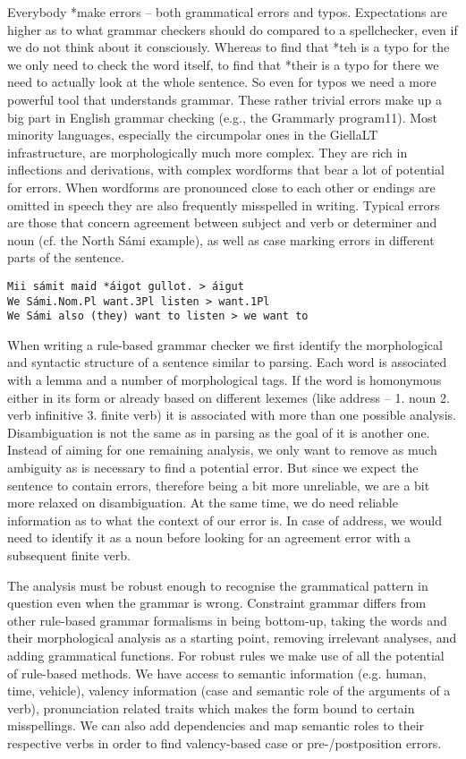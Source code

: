 \documentclass[free]{flammie}
\begin{document}
Everybody *make errors – both grammatical errors and typos. Expectations are higher as
to what grammar checkers should do compared to a spellchecker, even if we do not think
about it consciously. Whereas to find that *teh is a typo for the we only need to check the
word itself, to find that *their is a typo for there we need to actually look at the whole
sentence. So even for typos we need a more powerful tool that understands grammar.
These rather trivial errors make up a big part in English grammar checking (e.g., the
Grammarly program11). Most minority languages, especially the circumpolar ones in the
GiellaLT infrastructure, are morphologically much more complex. They are rich in inflections and derivations, with complex wordforms that bear a lot of potential for errors. When
wordforms are pronounced close to each other or endings are omitted in speech they are
also frequently misspelled in writing. Typical errors are those that concern agreement between subject and verb or determiner and noun (cf. the North Sámi example), as well as
case marking errors in different parts of the sentence.

\begin{verbatim}
Mii sámit maid *áigot gullot. > áigut
We Sámi.Nom.Pl want.3Pl listen > want.1Pl
We Sámi also (they) want to listen > we want to
\end{verbatim}

When writing a rule-based grammar checker we first identify the morphological and
syntactic structure of a sentence similar to parsing. Each word is associated with a lemma
and a number of morphological tags. If the word is homonymous either in its form or already based on different lexemes (like address – 1. noun 2. verb infinitive 3. finite verb) it
is associated with more than one possible analysis. Disambiguation is not the same as in
parsing as the goal of it is another one. Instead of aiming for one remaining analysis, we
only want to remove as much ambiguity as is necessary to find a potential error. But since
we expect the sentence to contain errors, therefore being a bit more unreliable, we are a bit
more relaxed on disambiguation. At the same time, we do need reliable information as to
what the context of our error is. In case of address, we would need to identify it as a noun
before looking for an agreement error with a subsequent finite verb.

The analysis must be robust enough to recognise the grammatical pattern in question
even when the grammar is wrong. Constraint grammar differs from other rule-based grammar formalisms in being bottom-up, taking the words and their morphological analysis as
a starting point, removing irrelevant analyses, and adding grammatical functions. For robust rules we make use of all the potential of rule-based methods. We have access to semantic information (e.g. human, time, vehicle), valency information (case and semantic
role of the arguments of a verb), pronunciation related traits which makes the form bound
to certain misspellings. We can also add dependencies and map semantic roles to their respective verbs in order to find valency-based case or pre-/postposition errors.
\end{document}
